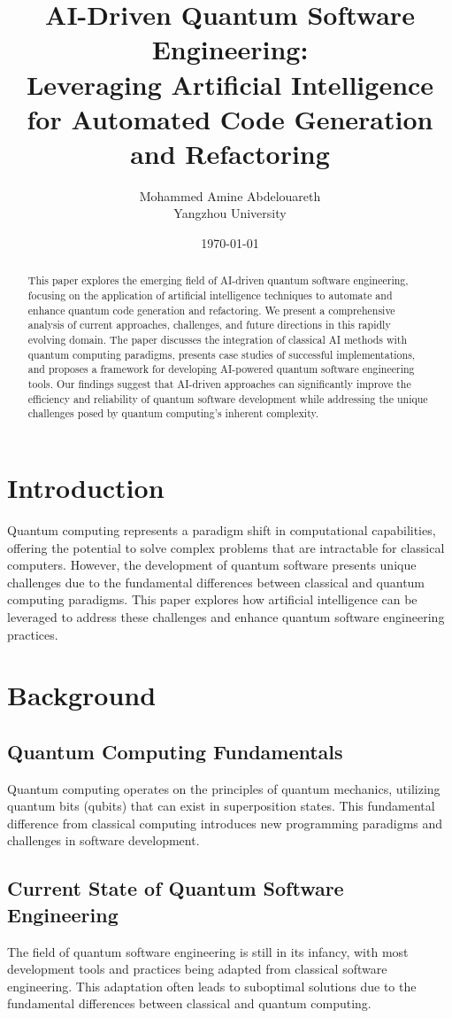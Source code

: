 \documentclass[12pt,a4paper]{article}
\title{AI-Driven Quantum Software Engineering:\\
Leveraging Artificial Intelligence for Automated Code Generation and Refactoring}
\author{Mohammed Amine Abdelouareth\\
Yangzhou University}
\date{\today}
\begin{document}
\maketitle

\begin{abstract}
This paper explores the emerging field of AI-driven quantum software engineering, focusing on the application of artificial intelligence techniques to automate and enhance quantum code generation and refactoring. We present a comprehensive analysis of current approaches, challenges, and future directions in this rapidly evolving domain. The paper discusses the integration of classical AI methods with quantum computing paradigms, presents case studies of successful implementations, and proposes a framework for developing AI-powered quantum software engineering tools. Our findings suggest that AI-driven approaches can significantly improve the efficiency and reliability of quantum software development while addressing the unique challenges posed by quantum computing's inherent complexity.
\end{abstract}

\section{Introduction}
Quantum computing represents a paradigm shift in computational capabilities, offering the potential to solve complex problems that are intractable for classical computers. However, the development of quantum software presents unique challenges due to the fundamental differences between classical and quantum computing paradigms. This paper explores how artificial intelligence can be leveraged to address these challenges and enhance quantum software engineering practices.

\section{Background}
\subsection{Quantum Computing Fundamentals}
Quantum computing operates on the principles of quantum mechanics, utilizing quantum bits (qubits) that can exist in superposition states. This fundamental difference from classical computing introduces new programming paradigms and challenges in software development.

\subsection{Current State of Quantum Software Engineering}
The field of quantum software engineering is still in its infancy, with most development tools and practices being adapted from classical software engineering. This adaptation often leads to suboptimal solutions due to the fundamental differences between classical and quantum computing.
\end{document}
